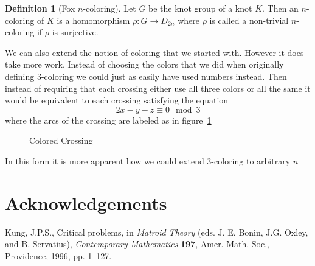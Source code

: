 \documentclass[12pt]{amsart}
\theoremstyle{definition}
\newtheorem{definition}[theorem]{Definition}
\theoremstyle{remark}
\numberwithin{equation}{section}
\begin{document}
\begin{definition}[Fox $n$-coloring]
  Let $G$ be the knot group of a knot $K$. Then
  an $n$-coloring of $K$ is a homomorphism $\rho: G\rightarrow D_{2n}$
  where $\rho$ is called a non-trivial $n$-coloring if $\rho$ is
  surjective.
\end{definition}

We can also extend the notion of coloring that we started
with. However it does take more work. Instead of choosing
the colors that we did when originally defining 3-coloring
we could just as easily have used numbers instead. Then
instead of requiring that each crossing either use all three
colors or all the same it would be equivalent to each
crossing satisfying the equation
\[
  2x-y-z\equiv 0 \mod 3
\]
where the arcs of the crossing are labeled as in figure~\ref{fig:numcolor}

\begin{figure}
  
  \caption{Colored Crossing}
  \label{fig:numcolor}
\end{figure}

In this form it is more apparent how we could extend 3-coloring
to arbitrary $n$

\section*{Acknowledgements}
\begin{thebibliography}{99}

 Kung, J.P.S., Critical problems, in {\em Matroid  
Theory} (eds. J. E. Bonin, J.G. Oxley, and B. Servatius), {\em  
Contemporary Mathematics} {\bf 197}, Amer. Math. Soc., Providence,  
1996, pp. 1--127.




\end{thebibliography}
\end{document}
